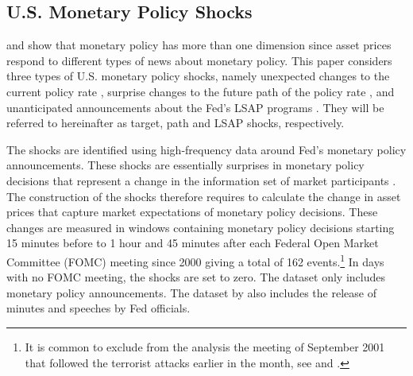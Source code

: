 {\subsection{U.S. Monetary Policy Shocks}
\iftoggle{toclinks}{\gototoc}{} %

\cite{GSS:2005a} and \cite{Swanson:2018} show that monetary policy has more than one dimension since asset prices respond to different types of news about monetary policy.
This paper considers three types of U.S. monetary policy shocks, namely
unexpected changes to the current policy rate \citep{Kuttner:2001}, surprise changes to the future path of the policy rate \citep{GSS:2005a}, and unanticipated announcements about the Fed's LSAP programs \citep{Swanson:2018}. 
They will be referred to hereinafter as target, path and LSAP shocks, respectively.

The shocks are identified using high-frequency data around Fed's monetary policy announcements.
These shocks are essentially surprises in monetary policy decisions that represent a change in the information set of market participants \citep{GurkaynakWright:2013,NakamuraSteinsson:2018JEP}.
The construction of the shocks therefore requires to calculate the change in asset prices that capture market expectations of monetary policy decisions.
These changes are measured in windows containing monetary policy decisions starting 15 minutes before to 1 hour and 45 minutes after each Federal Open Market Committee (FOMC) meeting since 2000 giving a total of 162 events.\footnote{ It is common to exclude from the analysis the meeting of September 2001 that followed the terrorist attacks earlier in the month, see \cite{GSS:2005a} and \cite{NakamuraSteinsson:2018JEP}.}
In days with no FOMC meeting, the shocks are set to zero.
The dataset only includes monetary policy announcements.
The dataset by \cite{FerrariKearnsSchrimpf:2017} also includes the release of minutes and speeches by Fed officials.

}
